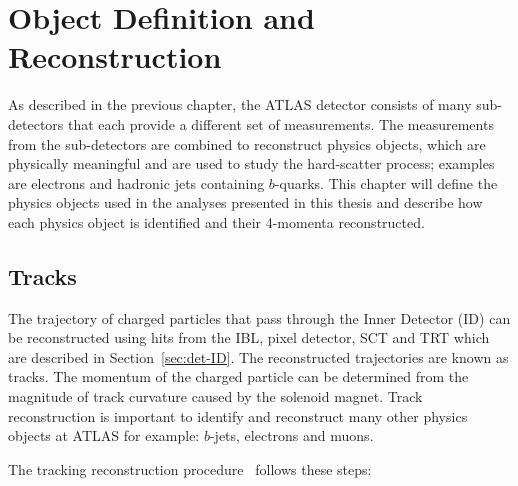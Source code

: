 \chapter{Object Definition and Reconstruction}
\label{sec:obj}

As described in the previous chapter,
the ATLAS detector consists of many sub-detectors
that each provide a different set of measurements.
The measurements from the sub-detectors are combined to reconstruct physics objects,
which are physically meaningful and are used to study the hard-scatter process;
examples are electrons and hadronic jets containing $b$-quarks.
This chapter will define the physics objects used in the analyses presented in this thesis
and describe how each physics object is identified and their 4-momenta reconstructed.

\section{Tracks}
\label{sec:obj-tracks}

The trajectory of charged particles that pass through the Inner Detector (ID) can be reconstructed
using hits from the IBL, pixel detector, SCT and TRT which are described in Section~\ref{sec:det-ID}.
The reconstructed trajectories are known as tracks.
The momentum of the charged particle can be determined from the magnitude of track curvature caused by the solenoid magnet.
Track reconstruction is important to identify and reconstruct many other physics objects at ATLAS
for example: $b$-jets, electrons and muons.

\noindent
The tracking reconstruction procedure~\cite{obj-tracks_TIDE} follows these steps:

